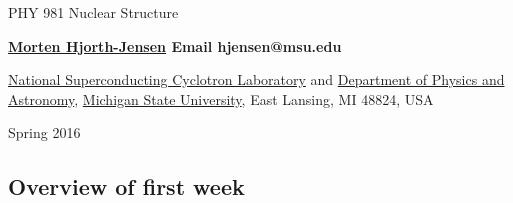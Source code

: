 \documentclass[%
oneside,                 %
final,                   %
10pt]{article}
\begin{document}






\thispagestyle{empty}

\begin{center}
{\LARGE\bf
\begin{spacing}{1.25}
PHY 981 Nuclear Structure
\end{spacing}
}
\end{center}


\begin{center}
{\bf \href{{https://github.com/mhjgit}}{Morten Hjorth-Jensen}  Email hjensen@msu.edu}
\end{center}

    \begin{center}
\centerline{{\small \href{{http://www.nscl.msu.edu/}}{National Superconducting Cyclotron Laboratory} and \href{{https://www.pa.msu.edu/}}{Department of Physics and Astronomy}, \href{{http://www.msu.edu/}}{Michigan State University}, East Lansing, MI 48824, USA}}
\end{center}
    

\begin{center}
Spring 2016 
\end{center}

\vspace{1cm}


\subsection{Overview of first week}

\paragraph{}
\end{document}
